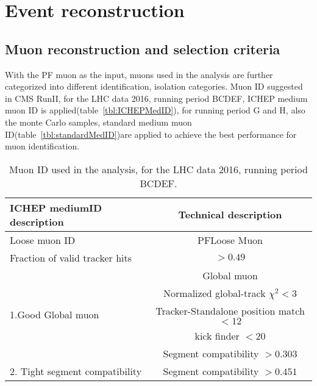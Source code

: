 \section{Event reconstruction}


\subsection{Muon reconstruction and selection criteria}

With the PF muon as the input, muons used in the analysis are further categorized into different identification, isolation categories. Muon ID suggested in CMS RunII, for the LHC data 2016, running period BCDEF, ICHEP medium muon ID is applied(table~\ref{tbl:ICHEPMedID}), for running period G and H, also the monte Carlo samples, standard medium muon ID(table~\ref{tbl:standardMedID})are applied to achieve the best performance for muon identification.


\begin{table}[!tpb]
\caption{Muon ID used in the analysis, for the LHC data 2016, running period BCDEF.  \label{tbl:ICHEPMedID}}
\label{tab:antil}
\begin{center}
\begin{tabular}{|l|c|}   
\hline
ICHEP mediumID description                    &  Technical description\\\hline
Loose muon ID                               & PFLoose Muon\\\hline
Fraction of valid tracker hits           & $>0.49$ \\\hline
\multirow{5}{*}{1.Good Global muon}                      &Global muon\\\cline{2-2}
                                                                        &Normalized global-track $\chi^{2}<3$\\\cline{2-2}
                                                                        &Tracker-Standalone position match $< 12$\\\cline{2-2}
                                                                        &kick finder $< 20$ \\\cline{2-2}
                                                                        &Segment compatibility $> 0.303$ \\\hline                                                                       
\hline
2. Tight segment compatibility      & Segment compatibility $>0.451$\\\hline
\end{tabular}
\end{center}
\end{table}


